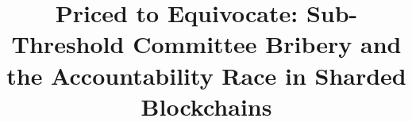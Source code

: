 \documentclass[conference]{IEEEtran}
\theoremstyle{plain}
\theoremstyle{definition}
\begin{document}
\title{Priced to Equivocate: Sub-Threshold Committee Bribery and the Accountability Race in Sharded Blockchains}

\author{}

\maketitle





















\end{document}

